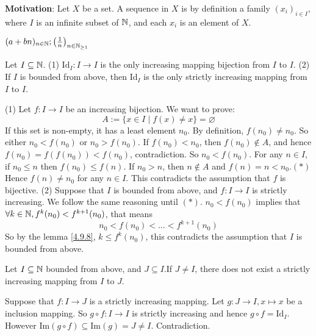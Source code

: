 \documentclass{book}
\numberwithin{equation}{section}
\begin{document}
\textbf{Motivation}: Let $X$ be a set. A sequence in $X$ is by definition a family $(x_i)_{i\in I}$, where $I$ is an infinite subset of $\mathbb{N}$, and each $x_i$ is an element of $X$.
\begin{exampleenv}
    $(a+bn)_{n\in \mathbb{N}};\left(\frac{1}{n}\right)_{n\in \mathbb{N}_{\ge 1}}$
\end{exampleenv}
\begin{propositionenv}
    Let $I\subseteq \mathbb{N}$.
    \newline
    (1) $\mathrm{Id}_I:I\rightarrow I$ is the only increasing mapping bijection from $I$ to $I$.
    \newline
    (2) If $I$ is bounded from above, then $\mathrm{Id}_I$ is the only strictly increasing mapping from $I$ to $I$.
\end{propositionenv}
\begin{proofenv}
    \quad
    \newline
    (1) Let $f:I\rightarrow I$ be an increasing bijection. We want to prove:
    $$A:=\{x\in I\mid f(x)\not=x\}=\varnothing$$
    If this set is non-empty, it has a least element $n_0$. By definition, $f(n_0)\not=n_0$. So either $n_0<f(n_0)$ or $n_0>f(n_0)$.
    \newline
    If $f(n_0)<n_0$, then $f(n_0)\notin A$, and hence $f(n_0)=f(f(n_0))<f(n_0)$, contradiction. So $n_0<f(n_0)$. For any $n\in I$, if $n_0\le n$ then $f(n_0)\le f(n)$. If $n_0>n$, then $n\notin A$ and $f(n)=n<n_0$.$(*)$Hence $f(n)\not=n_0$ for any $n\in I$. This contradicts the assumption that $f$ is bijective.
    \newline
    (2) Suppose that $I$ is bounded from above, and $f:I\rightarrow I$ is strictly increasing. We follow the same reasoning until $(*)$. $n_0<f(n_0)$ implies that $\forall k \in \mathbb{N}, f^k(n_0)<f^{k+1}(n_0)$, that means 
    $$n_0<f(n_0)<\dots <f^{k+1}(n_0)$$
    So by the lemma \ref{4.9.8}, $k\le f^k(n_0)$, this contradicts the assumption that $I$ is bounded from above.
\end{proofenv}
\begin{corollaryenv}
    Let $I\subseteq \mathbb{N}$ bounded from above, and $J\subseteq I$.If $J\not=I$, there does not exist a strictly increasing mapping from $I$ to $J$.
\end{corollaryenv}
\begin{proofenv}
    Suppose that $f:I\rightarrow J$ is a strictly increasing mapping. Let $g:J\rightarrow I,x\mapsto x$ be a inclusion mapping. So $g\circ f:I\rightarrow I$ is strictly increasing and hence $g\circ f=\mathrm{Id}_I$. However $\mathrm{Im}(g\circ f)\subseteq\mathrm{Im}(g)=J\not=I$. Contradiction.
\end{proofenv}
\end{document}
